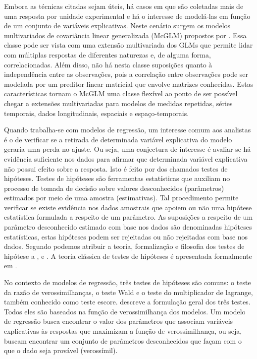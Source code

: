 Embora as técnicas citadas sejam úteis, há casos em que são coletadas mais de uma resposta por unidade experimental e há o interesse de modelá-las em função de um conjunto de variáveis explicativas. Neste cenário surgem os modelos multivariados de covariância linear generalizada (McGLM) propostos por \citet{Bonat16}. Essa classe pode ser vista com uma extensão multivariada dos GLMs que permite lidar com múltiplas respostas de diferentes naturezas e, de alguma forma, correlacionadas. Além disso, não há nesta classe suposições quanto à independência entre as observações, pois a correlação entre observações pode ser modelada por um preditor linear matricial que envolve matrizes conhecidas. Estas características tornam o McGLM uma classe flexível ao ponto de ser possível chegar a extensões multivariadas para modelos de medidas repetidas, séries temporais, dados longitudinais, espaciais e espaço-temporais.


Quando trabalha-se com modelos de regressão, um interesse comum aos analistas é o de verificar se a retirada de determinada variável explicativa do modelo geraria uma perda no ajuste. Ou seja, uma conjectura de interesse é avaliar se há evidência suficiente nos dados para afirmar que determinada variável explicativa não possui efeito sobre a resposta. Isto é feito por dos chamados testes de hipóteses. Testes de hipóteses são ferramentas estatísticas que auxiliam no processo de tomada de decisão sobre valores desconhecidos (parâmetros) estimados por meio de uma amostra (estimativas). Tal procedimento permite verificar se existe evidência nos dados amostrais que apoiem ou não uma hipótese estatística formulada a respeito de um parâmetro. As suposições a respeito de um parâmetro desconhecido estimado com base nos dados são denominadas hipóteses estatísticas, estas hipóteses podem ser rejeitadas ou não rejeitadas com base nos dados. Segundo \citet{lehmann} podemos atribuir a teoria, formalização e filosofia dos testes de hipótese a \citet{neyman1}, \citet{neyman2} e \citet{fisher}. A teoria clássica de testes de hipóteses é apresentada formalmente em \citet{lehmann2}.

No contexto de modelos de regressão, três testes de hipóteses são comuns: o teste da razão de verossimilhanças, o teste Wald e o teste do multiplicador de lagrange, também conhecido como teste escore. \citet{engle} descreve a formulação geral dos três testes. Todos eles são baseados na função de verossimilhança dos modelos. Um modelo de regressão busca encontrar o valor dos parâmetros que associam variáveis explicativas às respostas que maximizam a função de verossimilhança, ou seja, buscam encontrar um conjunto de parâmetros desconhecidos que façam com o que o dado seja provável (verossímil).

